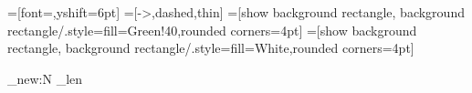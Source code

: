 =[font=\scriptsize,yshift=6pt]
=[->,dashed,thin]
=[show background rectangle,
background rectangle/.style={fill=Green!40,rounded corners=4pt}]
=[show background rectangle,
background rectangle/.style={fill=White,rounded corners=4pt}]

\newcommand{\createchain}[5]{%
  \draw #1
    \foreach \aid [count=\ai] in {#3} {
      \ifnum \ai = 1
      \else -- node[s,pos=.33] {$#5$} node[s,pos=.65] {$#4$} ++(#2,0)
      \fi
      node[inner sep=5pt,n] (\aid) {} };
  \putsites{#3}
}

\ExplSyntaxOn
\int_new:N \sites_len 
\newcommand{\putsites}[1]{%
  \clist_set:Nn \sites_clist {#1}
  \int_set:Nn \sites_len {\clist_count:N \sites_clist}
  \int_step_inline:nnnn {1}{1}{\sites_len}
  { \edef\aid{\clist_item:Nn \sites_clist {##1}}
    \begin{scope}[shift={(\aid)}]
      \int_compare:nTF { ##1 > 1 }
      { \site{l\aid}{\aid.west}; }{}
      \int_compare:nTF { ##1 < \sites_len }
      { \site{r\aid}{\aid.east}; }{}
    \end{scope}}
}
\ExplSyntaxOff


\newcommand{\dembs}[2][.1]{%
  \foreach \ai / \aj in {#2}
    \draw[emb] ($(\ai)!#1!(\aj.north)$) -- ($(\ai)!.9!(\aj.north)$);
}

